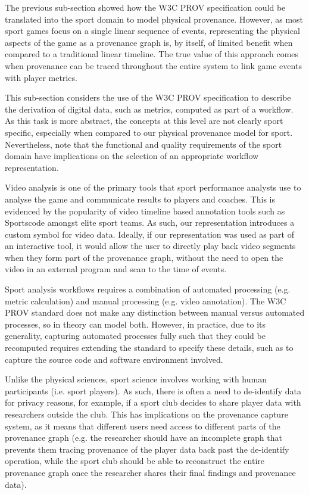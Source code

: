{}

{The previous sub-section showed how the W3C PROV specification could
be translated into the sport domain to model physical provenance.
However, as most sport games focus on a single linear sequence of
events, representing the physical aspects of the game as a provenance
graph is, by itself, of limited benefit when compared to a traditional
linear timeline. The true value of this approach comes when provenance
can be traced throughout the entire system to link game events with
player metrics.}

{}

{This sub-section considers the use of the W3C PROV specification to
describe the derivation of digital data, such as metrics, computed as
part of a workflow. As this task is more abstract, the concepts at this
level are not clearly sport specific, especially when compared to our
physical provenance model for sport. Nevertheless, note that the
functional and quality requirements of the sport domain have
implications on the selection of an appropriate workflow
representation.}

{}

{Video analysis is one of the primary tools that sport performance
analysts use to analyse the game and communicate results to players and
coaches. This is evidenced by the popularity of video timeline based
annotation tools such as Sportscode amongst
elite sport teams. As such, our representation introduces a custom
symbol for video data. Ideally, if our representation was
used as part of an interactive tool, it would allow the user to directly
play back video segments when they form part of the provenance graph,
without the need to open the video in an external program and scan to
the time of events.}

{}

{Sport analysis workflows requires a combination of automated processing
(e.g. metric calculation) and manual processing (e.g. video annotation).
The W3C PROV standard does not make any distinction between manual
versus automated processes, so in theory can model both. However, in
practice, due to its generality, capturing automated processes fully
such that they could be recomputed requires extending the standard to
specify these details, such as to capture the source code and software
environment involved.}

Unlike the physical sciences, sport science involves working with
human participants (i.e. sport players). As such, there is often a need
to de-identify data for privacy reasons, for example, if a sport club
decides to share player data with researchers outside the club. This has
implications on the provenance capture system, as it means that
different users need access to different parts of the provenance graph
(e.g. the researcher should have an incomplete graph that prevents them
tracing provenance of the player data back past the de-identify
operation, while the sport club should be able to reconstruct the entire
provenance graph once the researcher shares their final findings and
provenance data).

